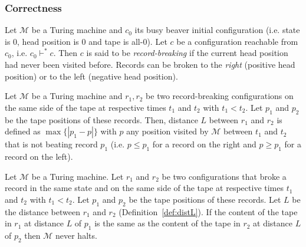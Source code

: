 \subsubsection{Correctness}

\begin{definition}
  Let $\mathcal{M}$ be a Turing machine and $c_0$ its busy beaver initial configuration (i.e. state is 0, head position is 0 and tape is all-0).
  Let $c$ be a configuration reachable from $c_0$, i.e. $c_0 \vdash^* c$.
  Then $c$ is said to be \textit{record-breaking} if the current head position had never been visited before. Records can be broken to the \textit{right} (positive head position) or to the left (negative head position).
\end{definition}

\begin{definition}\label{def:distL}
  Let $\mathcal{M}$ be a Turing machine and $r_1,r_2$ be two record-breaking configurations on the same side of the tape at respective times $t_1$ and $t_2$ with $t_1 < t_2$. Let $p_1$ and $p_2$ be the tape positions of these records. Then, distance $L$ between $r_1$ and $r_2$ is defined as $\max\{|p_1 - p|\}$ with $p$ any position visited by $\mathcal{M}$ between $t_1$ and $t_2$ that is not beating record $p_1$ (i.e. $p \leq p_1$ for a record on the right and $p \geq p_1$ for a record on the left).
\end{definition}

\begin{lemma}\label{lem:translated-cyclers}
  Let $\mathcal{M}$ be a Turing machine. Let $r_1$ and $r_2$ be two configurations that broke a record in the same state and on the same side of the tape at respective times $t_1$ and $t_2$ with $t_1 < t_2$. Let $p_1$ and $p_2$ be the tape positions of these records. Let $L$ be the distance between $r_1$ and $r_2$ (Definition~\ref{def:distL}). If the content of the tape in $r_1$ at distance $L$ of $p_1$ is the same as the content of the tape in $r_2$ at distance $L$ of $p_2$ then $\mathcal{M}$ never halts.
\end{lemma}


